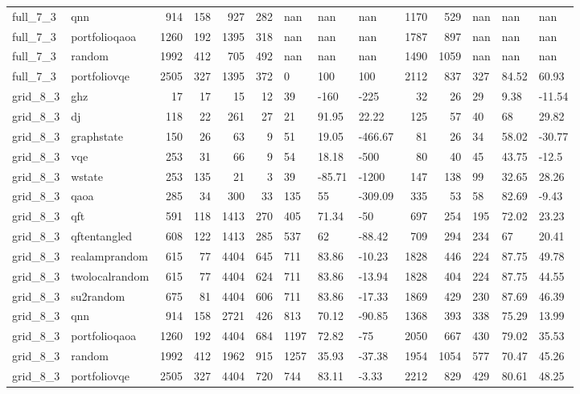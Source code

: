 \begin{longtable}{llrrrrlllrrlll}
full\_7\_3 & qnn & 914 & 158 & 927 & 282 & nan & nan & nan & 1170 & 529 & nan & nan & nan \\
full\_7\_3 & portfolioqaoa & 1260 & 192 & 1395 & 318 & nan & nan & nan & 1787 & 897 & nan & nan & nan \\
full\_7\_3 & random & 1992 & 412 & 705 & 492 & nan & nan & nan & 1490 & 1059 & nan & nan & nan \\
full\_7\_3 & portfoliovqe & 2505 & 327 & 1395 & 372 & 0 & 100 & 100 & 2112 & 837 & 327 & 84.52 & 60.93 \\
grid\_8\_3 & ghz & 17 & 17 & 15 & 12 & 39 & -160 & -225 & 32 & 26 & 29 & 9.38 & -11.54 \\
grid\_8\_3 & dj & 118 & 22 & 261 & 27 & 21 & 91.95 & 22.22 & 125 & 57 & 40 & 68 & 29.82 \\
grid\_8\_3 & graphstate & 150 & 26 & 63 & 9 & 51 & 19.05 & -466.67 & 81 & 26 & 34 & 58.02 & -30.77 \\
grid\_8\_3 & vqe & 253 & 31 & 66 & 9 & 54 & 18.18 & -500 & 80 & 40 & 45 & 43.75 & -12.5 \\
grid\_8\_3 & wstate & 253 & 135 & 21 & 3 & 39 & -85.71 & -1200 & 147 & 138 & 99 & 32.65 & 28.26 \\
grid\_8\_3 & qaoa & 285 & 34 & 300 & 33 & 135 & 55 & -309.09 & 335 & 53 & 58 & 82.69 & -9.43 \\
grid\_8\_3 & qft & 591 & 118 & 1413 & 270 & 405 & 71.34 & -50 & 697 & 254 & 195 & 72.02 & 23.23 \\
grid\_8\_3 & qftentangled & 608 & 122 & 1413 & 285 & 537 & 62 & -88.42 & 709 & 294 & 234 & 67 & 20.41 \\
grid\_8\_3 & realamprandom & 615 & 77 & 4404 & 645 & 711 & 83.86 & -10.23 & 1828 & 446 & 224 & 87.75 & 49.78 \\
grid\_8\_3 & twolocalrandom & 615 & 77 & 4404 & 624 & 711 & 83.86 & -13.94 & 1828 & 404 & 224 & 87.75 & 44.55 \\
grid\_8\_3 & su2random & 675 & 81 & 4404 & 606 & 711 & 83.86 & -17.33 & 1869 & 429 & 230 & 87.69 & 46.39 \\
grid\_8\_3 & qnn & 914 & 158 & 2721 & 426 & 813 & 70.12 & -90.85 & 1368 & 393 & 338 & 75.29 & 13.99 \\
grid\_8\_3 & portfolioqaoa & 1260 & 192 & 4404 & 684 & 1197 & 72.82 & -75 & 2050 & 667 & 430 & 79.02 & 35.53 \\
grid\_8\_3 & random & 1992 & 412 & 1962 & 915 & 1257 & 35.93 & -37.38 & 1954 & 1054 & 577 & 70.47 & 45.26 \\
grid\_8\_3 & portfoliovqe & 2505 & 327 & 4404 & 720 & 744 & 83.11 & -3.33 & 2212 & 829 & 429 & 80.61 & 48.25 \\

\end{longtable}

